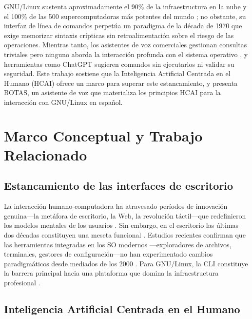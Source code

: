 \documentclass[12pt]{article}
\begin{document}
GNU/Linux sustenta aproximadamente el 90\% de la infraestructura en la nube y el
100\% de las 500 supercomputadoras más potentes del mundo
\cite{W3Techs2023, Top5002023}; no obstante, su interfaz de línea de comandos
perpetúa un paradigma de la década de 1970 \cite{Raymond2003} que exige memorizar
sintaxis crípticas sin retroalimentación sobre el riesgo de las operaciones.
Mientras tanto, los asistentes de voz comerciales gestionan consultas triviales
pero ninguno aborda la interacción profunda con el sistema operativo
\cite{Luger2016}, y herramientas como ChatGPT sugieren comandos sin ejecutarlos
ni validar su seguridad. Este trabajo sostiene que la Inteligencia Artificial
Centrada en el Humano (HCAI) \cite{Shneiderman2020, Shneiderman2022} ofrece un
marco para superar este estancamiento, y presenta BOTAS, un asistente de voz
que materializa los principios HCAI para la interacción con GNU/Linux en español.


\section{Marco Conceptual y Trabajo Relacionado}
\label{sec:framework}

\subsection{Estancamiento de las interfaces de escritorio}
\label{subsec:stagnation}

\noindent
La interacción humano-computadora ha atravesado períodos de innovación genuina---la
metáfora de escritorio, la Web, la revolución táctil---que redefinieron los modelos
mentales de los usuarios \cite{Norman1988}. Sin embargo, en el escritorio las
últimas dos décadas constituyen una meseta funcional \cite{Jenson2024}.
Estudios recientes confirman que las herramientas integradas en los SO modernos
---exploradores de archivos, terminales, gestores de configuración---no han
experimentado cambios paradigmáticos desde mediados de los 2000
\cite{Grudin2017}. Para GNU/Linux, la CLI constituye la barrera principal
hacia una plataforma que domina la infraestructura profesional \cite{W3Techs2023}.

\subsection{Inteligencia Artificial Centrada en el Humano}
\label{subsec:hcai}
\end{document}
